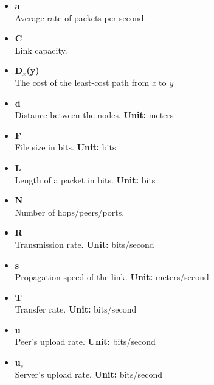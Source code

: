 \documentclass{article}
\begin{document}
\begin{itemize}
	\item \textbf{a}
	\vspace{.2cm} \\
	Average rate of packets per second.
	
	\item \textbf{C}
	\vspace{.2cm} \\
	Link capacity.
	
	\item \textbf{D$_x$(y)}
	\vspace{.2cm} \\
	The cost of the least-cost path from \textit{x} to \textit{y}
	
	\item \textbf{d}
	\vspace{.2cm} \\
	Distance between the nodes. \textbf{Unit:} meters
	
	\item \textbf{F}
	\vspace{.2cm} \\
	File size in bits. \textbf{Unit:} bits
	
	\item \textbf{L}
	\vspace{.2cm} \\
	Length of a packet in bits. \textbf{Unit:} bits
	
	\item \textbf{N}
	\vspace{.2cm} \\
	Number of hops/peers/ports.
	
	\item \textbf{R}
	\vspace{.2cm} \\
	Transmission rate. \textbf{Unit:} bits/second
	
	\item \textbf{s}
	\vspace{.2cm} \\
	Propagation speed of the link. \textbf{Unit:} meters/second
	
	\item \textbf{T}
	\vspace{.2cm} \\
	Transfer rate. \textbf{Unit:} bits/second
	
	\item \textbf{u}
	\vspace{.2cm} \\
	Peer's upload rate. \textbf{Unit:} bits/second
	
	\item \textbf{u$_s$}
	\vspace{.2cm} \\
	Server's upload rate. \textbf{Unit:} bits/second
\end{itemize}
\end{document}
